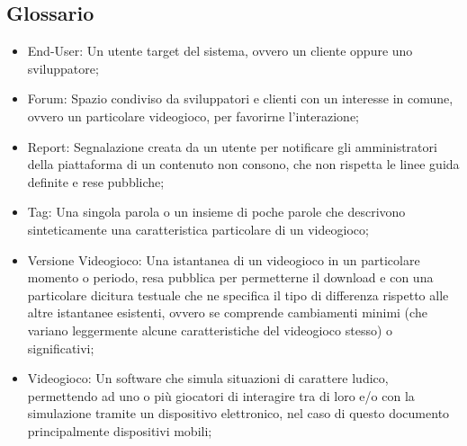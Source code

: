 \newpage
\subsection{Glossario}
\begin{itemize}
	\item End-User: Un utente target del sistema, ovvero un cliente oppure uno sviluppatore;
	\item Forum: Spazio condiviso da sviluppatori e clienti con un interesse in comune, ovvero un particolare videogioco, per favorirne l’interazione;
	\item Report: Segnalazione creata da un utente per notificare gli amministratori della piattaforma di un contenuto non consono, che non rispetta le linee guida definite e rese pubbliche;
	\item Tag: Una singola parola o un insieme di poche parole che descrivono sinteticamente una caratteristica particolare di un videogioco;
	\item Versione Videogioco: Una istantanea di un videogioco in un particolare momento o periodo, resa pubblica per permetterne il download e con una particolare dicitura testuale che ne specifica il tipo di differenza rispetto alle altre istantanee esistenti, ovvero se comprende cambiamenti minimi (che variano leggermente alcune caratteristiche del videogioco stesso) o significativi;
	\item Videogioco: Un software che simula situazioni di carattere ludico, permettendo ad uno o più giocatori di interagire tra di loro e/o con la simulazione tramite un dispositivo elettronico, nel caso di questo documento principalmente dispositivi mobili;
\end{itemize}